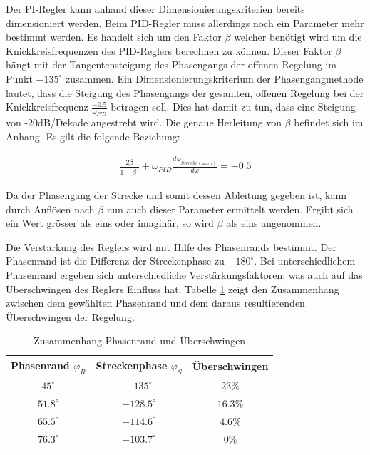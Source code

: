\newpage
Der PI-Regler kann anhand dieser Dimensionierungskriterien bereits dimensioniert werden. Beim PID-Regler muss allerdings noch ein Parameter mehr bestimmt werden. Es handelt sich um den Faktor $\beta$ welcher benötigt wird um die Knickkreisfrequenzen des PID-Reglers berechnen zu können. Dieser Faktor $\beta$ hängt mit der Tangentensteigung des Phasengangs der offenen Regelung im Punkt $-135^\circ$ zusammen.\newline
Ein Dimensionierungskriterium der Phasengangmethode lautet, dass die Steigung des Phasengangs der gesamten, offenen Regelung bei der Knickkreisfrequenz $\frac{-0.5}{\omega_{PID}}$ betragen soll. Dies hat damit zu tun, dass eine Steigung von -20dB/Dekade angestrebt wird. Die genaue Herleitung von $\beta$ befindet sich im Anhang. Es gilt die folgende Beziehung:\newline

\begin{align}
\frac{2\beta}{1+\beta^2} + \omega_{PID}\frac{d\varphi_{Strecke(\omega_{PID})}}{d\omega} = -0.5
\end{align}\newline

Da der Phasengang der Strecke und somit dessen Ableitung gegeben ist, kann durch Auflösen nach $\beta$ nun auch dieser Parameter ermittelt werden. Ergibt sich ein Wert grösser als eins oder imaginär, so wird $\beta$ als eins angenommen.

Die Verstärkung des Reglers wird mit Hilfe des Phasenrands bestimmt. Der Phasenrand ist die Differenz der Streckenphase zu $-180^\circ$. Bei unterschiedlichem Phasenrand ergeben sich unterschiedliche Verstärkungsfaktoren, was auch auf das Überschwingen des Reglers Einfluss hat. Tabelle \ref{phasenrand} zeigt den Zusammenhang zwischen dem gewählten Phasenrand und dem daraus resultierenden Überschwingen der Regelung.\newline


\begin{table}[h]
\centering
\renewcommand*{\arraystretch}{1.2}
\begin{tabular}{|c|c|c|}
\hline 
\textbf{Phasenrand $\varphi_R$} & \textbf{Streckenphase $\varphi_S$} & \textbf{Überschwingen} \\ 
\hline 
$45^\circ$ & $-135^\circ$ & $23\%$ \\ 
\hline 
$51.8^\circ$ & $-128.5^\circ$ & $16.3\%$ \\ 
\hline 
 $65.5^\circ$& $-114.6^\circ$ & $4.6\%$ \\ 
\hline 
$76.3^\circ$ & $-103.7^\circ$ & $0\%$ \\ 
\hline
\end{tabular} 
\caption{Zusammenhang Phasenrand und Überschwingen}
\label{phasenrand}
\renewcommand*{\arraystretch}{1}
\end{table}


